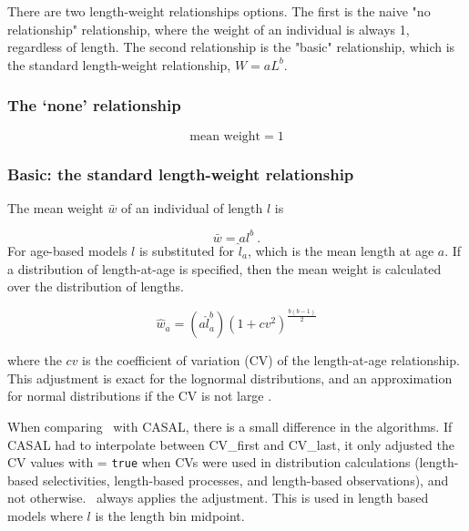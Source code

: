 There are two length-weight relationships options. The first is the naive "no relationship" relationship, where the weight of an individual is always 1, regardless of length. The second relationship is the "basic" relationship, which is the standard length-weight relationship, $W = aL^b$.

\subsubsection{The `none' relationship}\label{sec:LengthWeight-None}

\begin{equation}
  \text{mean weight}=1
\end{equation}

\subsubsection{Basic: the standard length-weight relationship}\label{sec:LengthWeight-Basic}

The mean weight $\bar{w}$ of an individual of length $l$ is

\begin{equation}
  \bar{w} =a l^b \ .
\end{equation}
\ifAgeBased
For age-based models \(l\) is substituted for $\hat{l}_a$, which is the mean length at age $a$. If a distribution of length-at-age is specified, then the mean weight is calculated over the distribution of lengths.

\begin{equation}\label{eq:mean_weight_with_adjustment}
	\hat{w}_a=(a\hat{l}_a^b)(1+cv^2)^{\frac{b(b-1)}{2}}
\end{equation}

where the $cv$ is the coefficient of variation (CV) of the length-at-age relationship. This adjustment is exact for the lognormal distributions, and an approximation for normal distributions if the CV is not large \citep{1388}. 

When comparing \CNAME\ with CASAL, there is a small difference in the algorithms. If CASAL had to interpolate between CV\_first and CV\_last, it only adjusted the CV values with  = \texttt{true} when CVs were used in distribution calculations (length-based selectivities, length-based processes, and length-based observations), and not otherwise. \CNAME\ always applies the adjustment.
\else
This is used in length based models where \(l\) is the length bin midpoint. 
\fi

